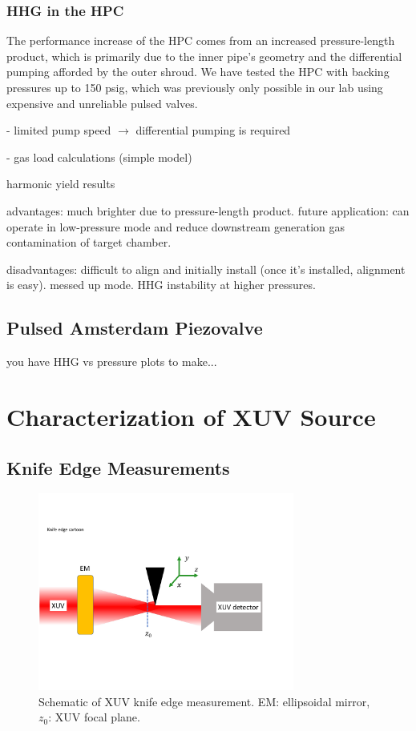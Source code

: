 \subsubsection{HHG in the HPC}


The performance increase of the HPC comes from an increased pressure-length product, which is primarily due to the inner pipe's geometry and the differential pumping afforded by the outer shroud. We have tested the HPC with backing pressures up to 150 psig, which was previously only possible in our lab using expensive and unreliable pulsed valves.


- limited pump speed $\rightarrow$ differential pumping is required

- gas load calculations (simple model)

harmonic yield results

advantages: much brighter due to pressure-length product. future application: can operate in low-pressure mode and reduce downstream generation gas contamination of target chamber.

disadvantages: difficult to align and initially install (once it's installed, alignment is easy). messed up mode. HHG instability at higher pressures.

\subsection{Pulsed Amsterdam Piezovalve}

you have HHG vs pressure plots to make...


\section{Characterization of XUV Source}

\subsection{Knife Edge Measurements}

\begin{figure}
	\centering
	\includegraphics[width=0.75\textwidth]{figures/chap3/knife_edge_cartoon.pdf}
	\caption{Schematic of XUV knife edge measurement. EM: ellipsoidal mirror, $z_0$: XUV focal plane.}
	\label{fig:knife_edge_cartoon}
\end{figure}

